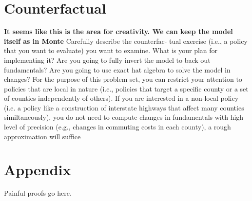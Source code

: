\documentclass{article}
\begin{document}
\section{Counterfactual}
\textbf{It seems like this is the area for creativity. We can keep the model itself as in Monte}
\label{sec:counterfactual}
Carefully describe the counterfac-
tual exercise (i.e., a policy that you want to evaluate) you want to examine. What is your plan for implementing it? Are you going to fully invert the model to back out
fundamentals? Are you going to use exact hat algebra to solve the model in changes?
For the purpose of this problem set, you can restrict your attention to policies that
are local in nature (i.e., policies that target a specific county or a set of counties
independently of others). If you are interested in a non-local policy (i.e. a policy like a
construction of interstate highways that affect many counties similtaneously), you do
not need to compute changes in fundamentals with high level of precision (e.g., changes
in commuting costs in each county), a rough approximation will suffice

\section{Appendix}
Painful proofs go here.


\end{document}
